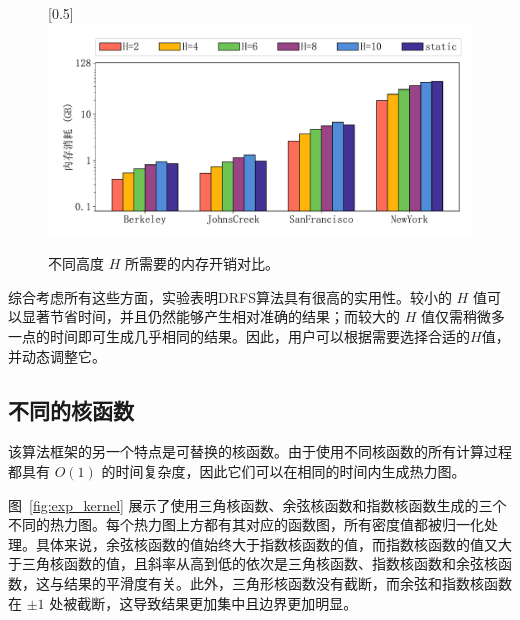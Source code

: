 \begin{figure}[h]\centering
	\scalebox{0.5}[0.5]{\includegraphics{./figures/EXP_H_Memory_zh.pdf}}
	\caption{不同高度 $H$ 所需要的内存开销对比。}
	\label{exp2.4}
\end{figure}


综合考虑所有这些方面，实验表明DRFS算法具有很高的实用性。较小的 $H$ 值可以显著节省时间，并且仍然能够产生相对准确的结果；而较大的 $H$ 值仅需稍微多一点的时间即可生成几乎相同的结果。因此，用户可以根据需要选择合适的$H$值，并动态调整它。

\subsection{不同的核函数}
	
	该算法框架的另一个特点是可替换的核函数。由于使用不同核函数的所有计算过程都具有 $O(1)$ 的时间复杂度，因此它们可以在相同的时间内生成热力图。

	图~\ref{fig:exp_kernel} 展示了使用三角核函数、余弦核函数和指数核函数生成的三个不同的热力图。每个热力图上方都有其对应的函数图，所有密度值都被归一化处理。具体来说，余弦核函数的值始终大于指数核函数的值，而指数核函数的值又大于三角核函数的值，且斜率从高到低的依次是三角核函数、指数核函数和余弦核函数，这与结果的平滑度有关。此外，三角形核函数没有截断，而余弦和指数核函数在 $\pm 1$ 处被截断，这导致结果更加集中且边界更加明显。


